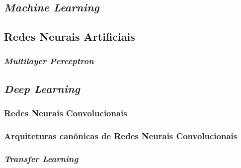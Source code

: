 
\subsection{\emph{Machine Learning}}


\subsection{Redes Neurais Artificiais}

\subsubsection{\emph{Multilayer Perceptron}}


\subsection{\emph{Deep Learning}}

\subsubsection{Redes Neurais Convolucionais}

\subsubsection{Arquiteturas canônicas de Redes Neurais Convolucionais}

\subsubsection{\emph{Transfer Learning}}